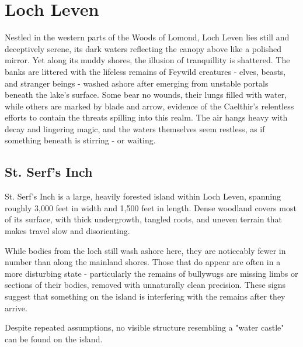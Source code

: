 \section*{Loch Leven}
{\entryfont Nestled in the western parts of the Woods of Lomond, Loch Leven lies still and deceptively serene, its dark waters reflecting the canopy above like a polished mirror. Yet along its muddy shores, the illusion of tranquillity is shattered. The banks are littered with the lifeless remains of Feywild creatures - elves, beasts, and stranger beings - washed ashore after emerging from unstable portals beneath the lake's surface. Some bear no wounds, their lungs filled with water, while others are marked by blade and arrow, evidence of the Caelthir's relentless efforts to contain the threats spilling into this realm. The air hangs heavy with decay and lingering magic, and the waters themselves seem restless, as if something beneath is stirring - or waiting.}
\subsection*{St. Serf's Inch}
{\entryfont St. Serf's Inch is a large, heavily forested island within Loch Leven, spanning roughly 3,000 feet in width and 1,500 feet in length. Dense woodland covers most of its surface, with thick undergrowth, tangled roots, and uneven terrain that makes travel slow and disorienting.

While bodies from the loch still wash ashore here, they are noticeably fewer in number than along the mainland shores. Those that do appear are often in a more disturbing state - particularly the remains of bullywugs are missing limbs or sections of their bodies, removed with unnaturally clean precision. These signs suggest that something on the island is interfering with the remains after they arrive.

Despite repeated assumptions, no visible structure resembling a "water castle" can be found on the island.}
